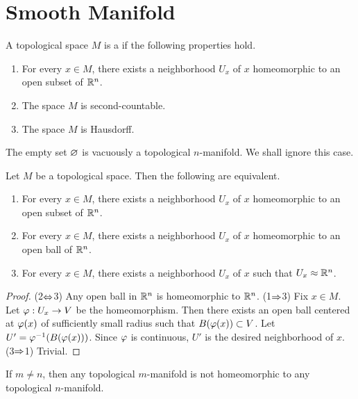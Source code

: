 \documentclass[10pt]{article}
\begin{document}
\htoc
\newpage
\hmain
\pagecountstart
{}
\section{Smooth Manifold}
\begin{definition}
    A topological space $M$ is a  if the following properties hold.
    \begin{enumerate}
        \item For every $x\in M$, there exists a neighborhood ${U}_{x}$ of $x$ homeomorphic to an open subset of ${\mathbb{R}}^{n}$.
        \item The space $M$ is second-countable.
        \item The space $M$ is Hausdorff.
    \end{enumerate}
\end{definition}
\begin{remark}
    The empty set $\varnothing$ is vacuously a topological $n$-manifold. We shall ignore this case.
\end{remark}
\begin{proposition}
    Let $M$ be a topological space. Then the following are equivalent.
    \begin{enumerate}
        \item For every $x\in M$, there exists a neighborhood ${U}_{x}$ of $x$ homeomorphic to an open subset of ${\mathbb{R}}^{n}$.
        \item For every $x\in M$, there exists a neighborhood ${U}_{x}$ of $x$ homeomorphic to an open ball of ${\mathbb{R}}^{n}$.
        \item For every $x\in M$, there exists a neighborhood ${U}_{x}$ of $x$ such that ${U}_{x}\approx{\mathbb{R}}^{n}$.
    \end{enumerate}
\end{proposition}
\begin{proof}
    (2$\Leftrightarrow$3) Any open ball in ${\mathbb{R}}^{n}$ is homeomorphic to ${\mathbb{R}}^{n}$. (1$\Rightarrow$3) Fix $x\in M$. Let $\varphi:{U}_{x}\to V$ be the homeomorphism. Then there exists an open ball centered at $\varphi(x)$ of sufficiently small radius such that $B(\varphi(x))\subset V$. Let $U'={\varphi}^{-1}(B(\varphi(x)))$. Since $\varphi$ is continuous, $U'$ is the desired neighborhood of $x$. (3$\Rightarrow$1) Trivial.
\end{proof}
\begin{proposition}
    If $m\ne n$, then any topological $m$-manifold is not homeomorphic to any topological $n$-manifold.
\end{proposition}
\end{document}
